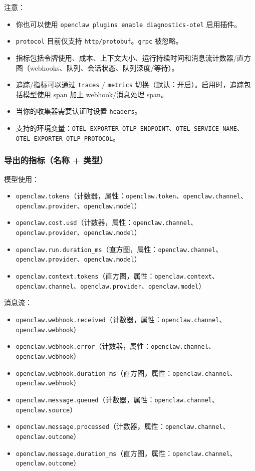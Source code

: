 注意：

\begin{itemize}
  \item 你也可以使用 \texttt{openclaw plugins enable diagnostics-otel} 启用插件。
  \item \texttt{protocol} 目前仅支持 \texttt{http/protobuf}。\texttt{grpc} 被忽略。
  \item 指标包括令牌使用、成本、上下文大小、运行持续时间和消息流计数器/直方图（webhooks、队列、会话状态、队列深度/等待）。
  \item 追踪/指标可以通过 \texttt{traces} / \texttt{metrics} 切换（默认：开启）。启用时，追踪包括模型使用 span 加上 webhook/消息处理 span。
  \item 当你的收集器需要认证时设置 \texttt{headers}。
  \item 支持的环境变量：\texttt{OTEL\_EXPORTER\_OTLP\_ENDPOINT}、\texttt{OTEL\_SERVICE\_NAME}、\texttt{OTEL\_EXPORTER\_OTLP\_PROTOCOL}。
\end{itemize}


\subsubsection{导出的指标（名称 + 类型）}


模型使用：

\begin{itemize}
  \item \texttt{openclaw.tokens}（计数器，属性：\texttt{openclaw.token}、\texttt{openclaw.channel}、\texttt{openclaw.provider}、\texttt{openclaw.model}）
  \item \texttt{openclaw.cost.usd}（计数器，属性：\texttt{openclaw.channel}、\texttt{openclaw.provider}、\texttt{openclaw.model}）
  \item \texttt{openclaw.run.duration\_ms}（直方图，属性：\texttt{openclaw.channel}、\texttt{openclaw.provider}、\texttt{openclaw.model}）
  \item \texttt{openclaw.context.tokens}（直方图，属性：\texttt{openclaw.context}、\texttt{openclaw.channel}、\texttt{openclaw.provider}、\texttt{openclaw.model}）
\end{itemize}


消息流：

\begin{itemize}
  \item \texttt{openclaw.webhook.received}（计数器，属性：\texttt{openclaw.channel}、\texttt{openclaw.webhook}）
  \item \texttt{openclaw.webhook.error}（计数器，属性：\texttt{openclaw.channel}、\texttt{openclaw.webhook}）
  \item \texttt{openclaw.webhook.duration\_ms}（直方图，属性：\texttt{openclaw.channel}、\texttt{openclaw.webhook}）
  \item \texttt{openclaw.message.queued}（计数器，属性：\texttt{openclaw.channel}、\texttt{openclaw.source}）
  \item \texttt{openclaw.message.processed}（计数器，属性：\texttt{openclaw.channel}、\texttt{openclaw.outcome}）
  \item \texttt{openclaw.message.duration\_ms}（直方图，属性：\texttt{openclaw.channel}、\texttt{openclaw.outcome}）
\end{itemize}


